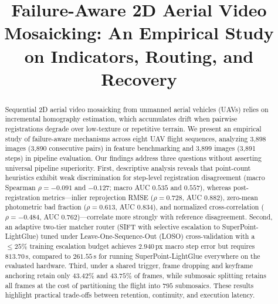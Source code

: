 \documentclass[conference]{IEEEtran}
\begin{document}
\title{Failure-Aware 2D Aerial Video Mosaicking: An Empirical Study on Indicators, Routing, and Recovery}

\author{
\and
{}
\and
{}
\and
{}
}

\maketitle

\begin{abstract}
Sequential 2D aerial video mosaicking from unmanned aerial vehicles (UAVs) relies on incremental homography estimation, which accumulates drift when pairwise registrations degrade over low-texture or repetitive terrain. We present an empirical study of failure-aware mechanisms across eight UAV flight sequences, analyzing 3,898 images (3,890 consecutive pairs) in feature benchmarking and 3,899 images (3,891 steps) in pipeline evaluation. Our findings address three questions without asserting universal pipeline superiority. First, descriptive analysis reveals that point-count heuristics exhibit weak discrimination for step-level registration disagreement (macro Spearman $\rho = -0.091$ and $-0.127$; macro AUC $0.535$ and $0.557$), whereas post-registration metrics---inlier reprojection RMSE ($\rho = 0.728$, AUC $0.882$), zero-mean photometric bad fraction ($\rho = 0.613$, AUC $0.834$), and normalized cross-correlation ($\rho = -0.484$, AUC $0.762$)---correlate more strongly with reference disagreement. Second, an adaptive two-tier matcher router (SIFT with selective escalation to SuperPoint-LightGlue) tuned under Leave-One-Sequence-Out (LOSO) cross-validation with a $\le 25\%$ training escalation budget achieves $2.940$\,px macro step error but requires $813.70$\,s, compared to $261.55$\,s for running SuperPoint-LightGlue everywhere on the evaluated hardware. Third, under a shared trigger, frame dropping and keyframe anchoring retain only $43.42\%$ and $43.75\%$ of frames, while submosaic splitting retains all frames at the cost of partitioning the flight into $795$ submosaics. These results highlight practical trade-offs between retention, continuity, and execution latency.
\end{abstract}
\end{document}
